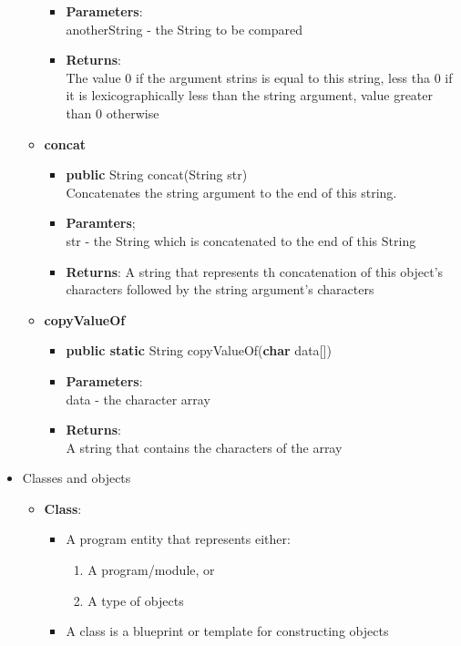 \documentclass[a4paper]{article}
\begin{document}
\begin{itemize}
\begin{itemize}
\begin{itemize}
          \item \textbf{Parameters}:\\anotherString - the String to be compared
          \item \textbf{Returns}:\\The value 0 if the argument strins is equal to this string, less tha 0 if it is lexicographically less than the string argument, value greater than 0 otherwise
        \end{itemize}
        \item \textbf{concat}
          \begin{itemize}
            \item \textbf{public} String concat(String str)\\Concatenates the string argument to the end of this string.
            \item \textbf{Paramters};\\str - the String which is concatenated to the end of this String
            \item \textbf{Returns}: A string that represents th concatenation of this object's characters followed by the string argument's characters
          \end{itemize}
          \item \textbf{copyValueOf}
            \begin{itemize}
              \item \textbf{public static} String copyValueOf(\textbf{char} data[])
              \item \textbf{Parameters}:\\data - the character array
              \item \textbf{Returns}:\\A string that contains the characters of the array
            \end{itemize}
    \end{itemize}
    \item Classes and objects
      \begin{itemize}
        \item \textbf{Class}:
          \begin{itemize}
        \item A program entity that represents either:
          \begin{enumerate}
            \item A program/module, or
            \item A type of objects
          \end{enumerate}
            \item A class is a blueprint or template for constructing objects
          \end{itemize}
      \end{itemize}
\end{itemize}
\end{document}
